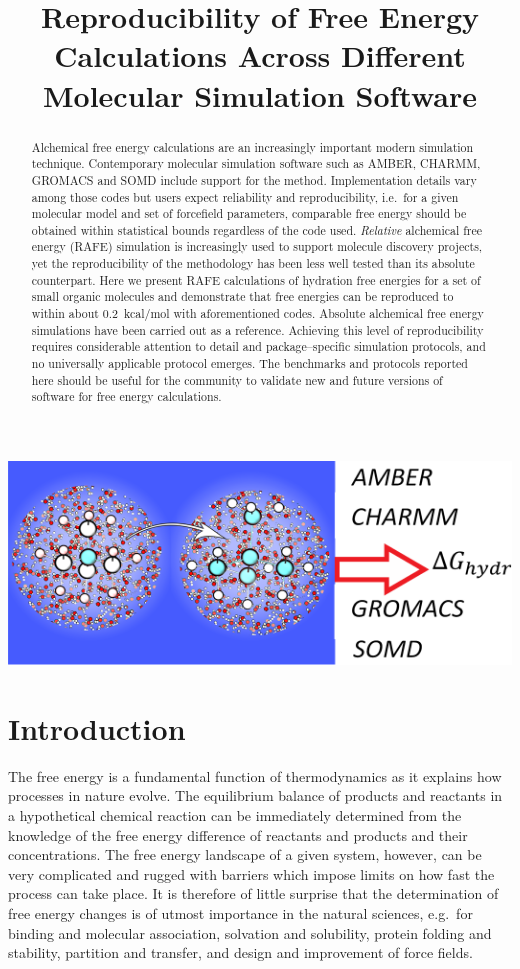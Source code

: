 \documentclass[journal=jctcce,manuscript=article]{achemso}
\title{Reproducibility of Free Energy Calculations Across Different Molecular Simulation Software}
\begin{document}
\begin{abstract}
  Alchemical free energy calculations are an increasingly
  important modern simulation technique.  Contemporary molecular
  simulation software such as AMBER, CHARMM, GROMACS and SOMD include
  support for the method.  Implementation details vary among those
  codes but users expect reliability and reproducibility, i.e.\ for a
  given molecular model and set of forcefield parameters, comparable
  free energy should be obtained within statistical bounds regardless
  of the code used.  \emph{Relative} alchemical free energy (RAFE)
  simulation is increasingly used to support molecule discovery
  projects, yet the reproducibility of the methodology has been less
  well tested than its absolute counterpart.  Here we present
  RAFE calculations of hydration free energies for a set
  of small organic molecules and demonstrate that free energies can be
  reproduced to within about \SI{0.2}{kcal/mol} with aforementioned
  codes.  Absolute alchemical free energy simulations have been
  carried out as a reference.  Achieving this level of reproducibility
  requires considerable attention to detail and package--specific
  simulation protocols, and no universally applicable protocol
  emerges. The  benchmarks and protocols reported here should be
  useful for the community to validate new and future versions of
  software for free energy calculations.
\end{abstract}

\begin{tocentry}
  \includegraphics[scale=1.0]{figures/final_toc.pdf}
\end{tocentry}

\section{Introduction}
\label{sec:intro}

The free energy is a fundamental function of thermodynamics as it explains
how processes in nature evolve.  The equilibrium balance of products and reactants in a hypothetical chemical reaction can be immediately determined
from the knowledge of the free energy difference of reactants and
products and their concentrations.  The free energy landscape of a given
system, however, can be very complicated and rugged with barriers which impose
limits on how fast the process can take place.  It is therefore of
little surprise that the determination of free energy changes is of
utmost importance in the natural sciences, e.g.\ for binding and
molecular association, solvation and solubility, protein folding and
stability, partition and transfer, and design and improvement of force
fields.
\end{document}
